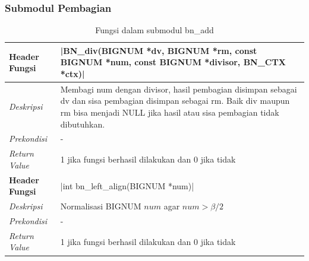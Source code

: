 \subsubsection{Submodul Pembagian}
\begin{table}[h]
  \caption{Fungsi dalam submodul bn\_add}
  \begin{tabular}{R{2.5cm}L{10.5cm}}
\toprule
\textbf{Header Fungsi} & |BN_div(BIGNUM *dv, BIGNUM *rm, const BIGNUM *num, const BIGNUM *divisor, BN_CTX *ctx)|    \\ \midrule
\textit{Deskripsi}     &  Membagi num dengan divisor, hasil pembagian disimpan sebagai dv dan sisa pembagian disimpan sebagai rm. Baik div maupun rm bisa menjadi NULL jika hasil atau sisa pembagian tidak dibutuhkan. \\
\textit{Prekondisi}    &  -\\
\textit{Return Value}  &1 jika fungsi berhasil dilakukan dan 0 jika tidak
 \\ \bottomrule
\textbf{Header Fungsi} & |int bn_left_align(BIGNUM *num)|    \\ \midrule
\textit{Deskripsi}     &  Normalisasi BIGNUM $num$ agar $num > \beta/2$\\
\textit{Prekondisi}    & - \\
\textit{Return Value}  & 1 jika fungsi berhasil dilakukan dan 0 jika tidak
 \\ \bottomrule
\end{tabular}

\end{table}
